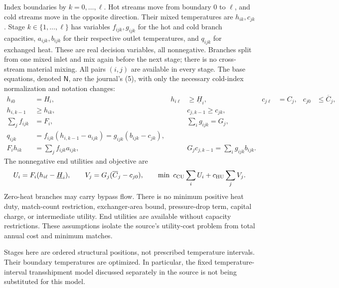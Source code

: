 \documentclass[11pt,a4paper]{report}
\newcommand{\NN}{\mathsf{N}}
\begin{document}
Index boundaries by $k=0,\ldots,\ell$. Hot streams move from boundary 0 to
$\ell$, and cold streams move in the opposite direction. Their mixed
temperatures are $h_{ik},c_{jk}$. Stage $k\in\{1,\ldots,\ell\}$ has variables
$f_{ijk},g_{ijk}$ for the hot and cold branch capacities, $a_{ijk},b_{ijk}$
for their respective outlet temperatures, and $q_{ijk}$ for exchanged heat.
These are real decision variables, all nonnegative. Branches split from one
mixed inlet and mix again before the next stage; there is no cross-stream
material mixing. All pairs $(i,j)$ are available in every stage.
The base equations, denoted $\NN$, are the journal's (5), with only the
necessary cold-index normalization and notation changes:
\begin{align}
 h_{i0}&=H_i,& h_{i\ell}&\geq\underline H_i,&
 c_{j\ell}&=C_j,&c_{j0}&\leq\overline C_j,\label{eq:ends}\\
 h_{i,k-1}&\geq h_{ik},&&c_{j,k-1}\geq c_{jk},\label{eq:mono}\\
 \sum_j f_{ijk}&=F_i,&&\sum_i g_{ijk}=G_j,\label{eq:split}\\
 q_{ijk}&=f_{ijk}(h_{i,k-1}-a_{ijk})
          =g_{ijk}(b_{ijk}-c_{jk}),\label{eq:heat}\\
 F_i h_{ik}&=\sum_j f_{ijk}a_{ijk},&&
 G_j c_{j,k-1}=\sum_i g_{ijk}b_{ijk}.\label{eq:mix}
\end{align}
The nonnegative end utilities and objective are
\begin{equation}\label{eq:obj}
 U_i=F_i(h_{i\ell}-\underline H_i),\qquad
 V_j=G_j(\overline C_j-c_{j0}),\qquad
 \min\ c_{\rm CU}\sum_i U_i+c_{\rm HU}\sum_j V_j.
\end{equation}
Zero-heat branches may carry bypass flow. There is no minimum positive heat
duty, match-count restriction, exchanger-area bound, pressure-drop term,
capital charge, or intermediate utility. End utilities are available without
capacity restrictions. These assumptions isolate the source's utility-cost
problem from total annual cost and minimum matches.

Stages here are ordered structural positions, not prescribed temperature
intervals. Their boundary temperatures are optimized. In particular, the
fixed temperature-interval transshipment model discussed separately in the
source is not being substituted for this model.
\end{document}
